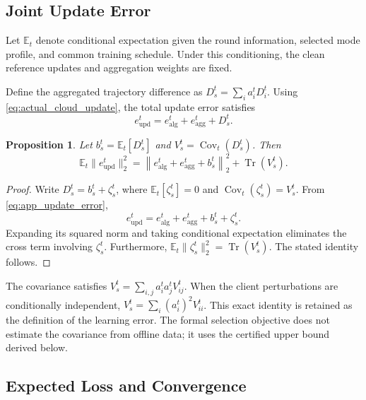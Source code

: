 \documentclass[5p,times]{elsarticle}
\theoremstyle{plain}
\newtheorem{proposition}[theorem]{Proposition}
\theoremstyle{definition}
\theoremstyle{remark}
\begin{document}
\subsection{Joint Update Error}

Let \(\mathbb E_t\) denote conditional
expectation given the round information,
selected mode profile, and common
training schedule. Under this conditioning,
the clean reference updates and aggregation
weights are fixed.

Define the aggregated trajectory difference
as \(D_s^t=\sum_i a_i^tD_i^t\).
Using \eqref{eq:actual_cloud_update},
the total update error satisfies
\begin{equation}
e_{\mathrm{upd}}^t
=
e_{\mathrm{alg}}^t
+
e_{\mathrm{agg}}^t
+
D_s^t.
\label{eq:app_update_error}
\end{equation}

\begin{proposition}
\label{prop:joint_error}
Let
\(b_s^t=\mathbb E_t[D_s^t]\)
and \(V_s^t=\operatorname{Cov}_t(D_s^t)\).
Then
\begin{equation}
\mathbb E_t
\|e_{\mathrm{upd}}^t\|_2^2
=
\left\|
e_{\mathrm{alg}}^t+
e_{\mathrm{agg}}^t+b_s^t
\right\|_2^2
+
\operatorname{Tr}(V_s^t).
\label{eq:app_joint_error}
\end{equation}
\end{proposition}

\begin{proof}
Write
\(D_s^t=b_s^t+\zeta_s^t\),
where \(\mathbb E_t[\zeta_s^t]=0\)
and
\(\operatorname{Cov}_t(\zeta_s^t)=V_s^t\).
From \eqref{eq:app_update_error},
\begin{equation}
e_{\mathrm{upd}}^t
=
e_{\mathrm{alg}}^t+
e_{\mathrm{agg}}^t+
b_s^t+\zeta_s^t.
\end{equation}
Expanding its squared norm and taking
conditional expectation eliminates the
cross term involving \(\zeta_s^t\).
Furthermore,
\(\mathbb E_t\|\zeta_s^t\|_2^2
=\operatorname{Tr}(V_s^t)\).
The stated identity follows.
\end{proof}

The covariance satisfies
\(
V_s^t=\sum_{i,j}a_i^ta_j^tV_{ij}^t
\).
When the client perturbations are
conditionally independent,
\(
V_s^t=\sum_i(a_i^t)^2V_{ii}^t
\).
This exact identity is retained as the definition of
the learning error. The formal selection objective does
not estimate the covariance from offline data; it uses
the certified upper bound derived below.

\subsection{Expected Loss and Convergence}
\end{document}
